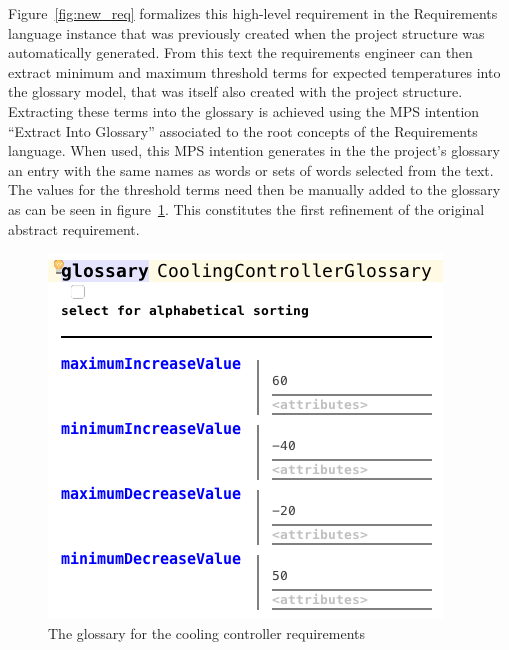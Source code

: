 Figure~\ref{fig:new_req} formalizes this high-level requirement in
the \textsf{Requirements} language instance that was previously created when the 
project structure was automatically generated. From this text the requirements engineer can then
extract minimum and maximum threshold terms for expected temperatures into
the glossary model, that was itself also created with the project structure.
Extracting these terms into the glossary is achieved using the
MPS intention ``Extract Into Glossary'' associated to the root concepts of the
\textsf{Requirements} language. When used, this MPS intention generates in the
the project's glossary an entry with the same names as words
or sets of words selected from the text.
The values for the threshold terms need then be manually added to the glossary
as can be seen in figure~\ref{fig:glossary}. This constitutes the first refinement of the
original abstract requirement.

\begin{figure}[!h]
\centering 
\includegraphics[width=.7\textwidth]{./figures/glossary.png}
\caption{The glossary for the cooling controller requirements}
\label{fig:glossary}
\end{figure}

% 

